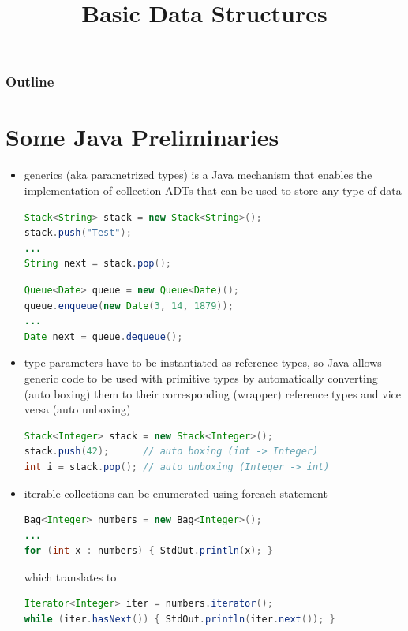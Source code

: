 \documentclass[8pt,a4paper,compress]{beamer}
\title{Basic Data Structures}
\date{}
\begin{document}
\begin{frame}
\vfill
\titlepage
\end{frame}

\begin{frame}
\frametitle{Outline}
\tableofcontents
\end{frame}

\section{Some Java Preliminaries}
\begin{frame}[fragile]
\begin{itemize}
\item generics (aka parametrized types) is a Java mechanism that enables the implementation of collection ADTs that can be used to store any type of data

\begin{lstlisting}[language=Java]
Stack<String> stack = new Stack<String>();
stack.push("Test");
...
String next = stack.pop();
\end{lstlisting}

\begin{lstlisting}[language=Java]
Queue<Date> queue = new Queue<Date)();
queue.enqueue(new Date(3, 14, 1879));
...
Date next = queue.dequeue();
\end{lstlisting}

\item type parameters have to be instantiated as reference types, so Java allows generic code to be used with primitive types by automatically converting (auto boxing) them to their corresponding (wrapper) reference types and vice versa (auto unboxing)
\begin{lstlisting}[language=Java]
Stack<Integer> stack = new Stack<Integer>();
stack.push(42);      // auto boxing (int -> Integer)
int i = stack.pop(); // auto unboxing (Integer -> int)
\end{lstlisting}

\item iterable collections can be enumerated using foreach statement 
\begin{lstlisting}[language=Java]
Bag<Integer> numbers = new Bag<Integer>();
...
for (int x : numbers) { StdOut.println(x); }
\end{lstlisting}

which translates to 

\begin{lstlisting}[language=Java]
Iterator<Integer> iter = numbers.iterator();
while (iter.hasNext()) { StdOut.println(iter.next()); }
\end{lstlisting}
\end{itemize}
\end{frame}
\end{document}
